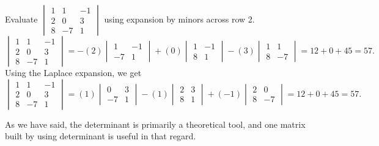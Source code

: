 \documentclass[../main.tex]{subfiles}
\begin{document}
\begin{example}
  Evaluate \(
  \begin{vmatrix}
    1 & 1 & -1\\
    2 & 0 & 3\\
    8 & -7 & 1
  \end{vmatrix}
  \) using expansion by minors across row 2.
  \begin{equation*}
    \begin{vmatrix}
      1 & 1 & -1\\
      2 & 0 & 3\\
      8 & -7 & 1
    \end{vmatrix}
    =-(2)
    \begin{vmatrix}
      1 & -1\\
      -7 & 1
   \end{vmatrix}
   +(0)
    \begin{vmatrix}
      1 & -1\\
      8 & 1
   \end{vmatrix}
   -(3)
    \begin{vmatrix}
      1 & 1\\
      8 & -7
   \end{vmatrix} = 12 + 0 + 45 = 57.
  \end{equation*}
  Using the Laplace expansion, we get
  \begin{equation*}
    \begin{vmatrix}
      1 & 1 & -1\\
      2 & 0 & 3\\
      8 & -7 & 1
    \end{vmatrix}
    =(1)
    \begin{vmatrix}
      0 & 3\\
      -7 & 1
   \end{vmatrix}
   -(1)
    \begin{vmatrix}
      2 & 3\\
      8 & 1
   \end{vmatrix}
   +(-1)
    \begin{vmatrix}
      2 & 0\\
      8 & -7
   \end{vmatrix} = 12 + 0 + 45 = 57.
  \end{equation*}
\end{example}

As we have said, the determinant is primarily a theoretical tool, and one matrix built by using determinant is useful in that regard.
\end{document}
